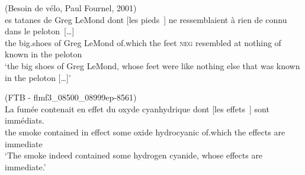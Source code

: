 \ex (Besoin de vélo, Paul Fournel, 2001)\\
\gll [l]es tatanes de Greg LeMond dont [les pieds~\trace{}] ne ressemblaient à rien de connu dans le peloton~[\dots]\\
the big.shoes of Greg LeMond of.which the feet \textsc{neg} resembled at nothing of known in the peloton\\
\glt `the big shoes of Greg LeMond, whose feet were like nothing else that was known in the peloton [\dots]'
\label{ex:d2000-subj-unerg}

\ex (FTB - flmf3\_08500\_08999ep-8561)\nopagebreak\\
\gll La fumée contenait en effet du oxyde cyanhydrique dont [les effets~\trace{}] sont immédiats.\\
the smoke contained in effect some oxide hydrocyanic of.which the effects are immediate\\
\glt `The smoke indeed contained  some hydrogen cyanide, whose effects are immediate.'
\label{ex:FTB-subj-state}

